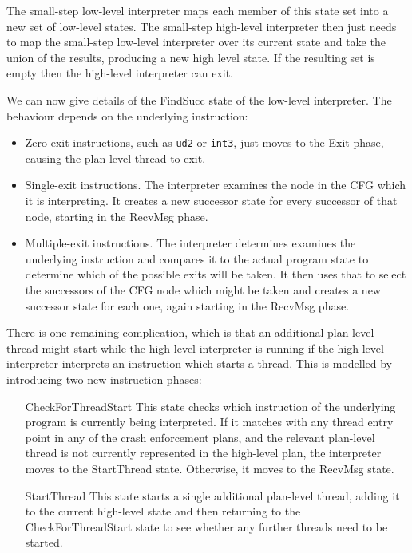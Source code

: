 \documentclass[12pt,a4paper]{book}
\begin{document}
The small-step low-level interpreter maps each member of this state set into a new set of low-level states.
The small-step high-level interpreter then just needs to map the small-step low-level interpreter over its current state and take the union of the results, producing a new high level state.
If the resulting set is empty then the high-level interpreter can exit.


We can now give details of the FindSucc state of the low-level interpreter.
The behaviour depends on the underlying instruction:

\begin{itemize}
\item
  Zero-exit instructions, such as \verb|ud2| or \verb|int3|, just moves to the Exit phase, causing the plan-level thread to exit.
\item
  Single-exit instructions.
  The interpreter examines the node in the CFG which it is interpreting.
  It creates a new successor state for every successor of that node, starting in the RecvMsg phase.
\item
  Multiple-exit instructions.
  The interpreter determines examines the underlying instruction and compares it to the actual program state to determine which of the possible exits will be taken.
  It then uses that to select the successors of the CFG node which might be taken and creates a new successor state for each one, again starting in the RecvMsg phase.
\end{itemize}

There is one remaining complication, which is that an additional plan-level thread might start while the high-level interpreter is running if the high-level interpreter interprets an instruction which starts a thread.
This is modelled by introducing two new instruction phases:

\begin{itemize}
\item[CheckForThreadStart]
  This state checks which instruction of the underlying program is currently being interpreted.
  If it matches with any thread entry point in any of the crash enforcement plans, and the relevant plan-level thread is not currently represented in the high-level plan, the interpreter moves to the StartThread state.
  Otherwise, it moves to the RecvMsg state.
\item[StartThread]
  This state starts a single additional plan-level thread, adding it to the current high-level state and then returning to the CheckForThreadStart state to see whether any further threads need to be started.
\end{itemize}
\end{document}
